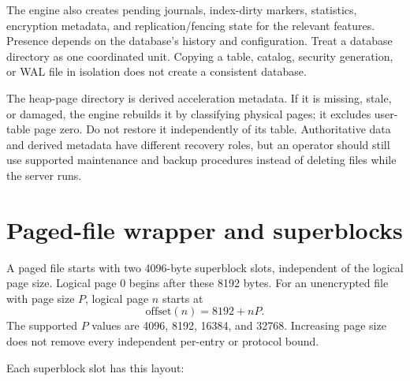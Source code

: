The engine also creates pending journals, index-dirty markers, statistics, encryption metadata, and replication/fencing state for the relevant features. Presence depends on the database's history and configuration. Treat a database directory as one coordinated unit. Copying a table, catalog, security generation, or WAL file in isolation does not create a consistent database.

The heap-page directory is derived acceleration metadata. If it is missing, stale, or damaged, the engine rebuilds it by classifying physical pages; it excludes user-table page zero. Do not restore it independently of its table. Authoritative data and derived metadata have different recovery roles, but an operator should still use supported maintenance and backup procedures instead of deleting files while the server runs.


\section{Paged-file wrapper and superblocks}

A paged file starts with two 4096-byte superblock slots, independent of the logical page size. Logical page 0 begins after these 8192 bytes. For an unencrypted file with page size $P$, logical page $n$ starts at
\[
  \mathrm{offset}(n) = 8192 + nP.
\]
The supported $P$ values are 4096, 8192, 16384, and 32768. Increasing page size does not remove every independent per-entry or protocol bound.

Each superblock slot has this layout:

